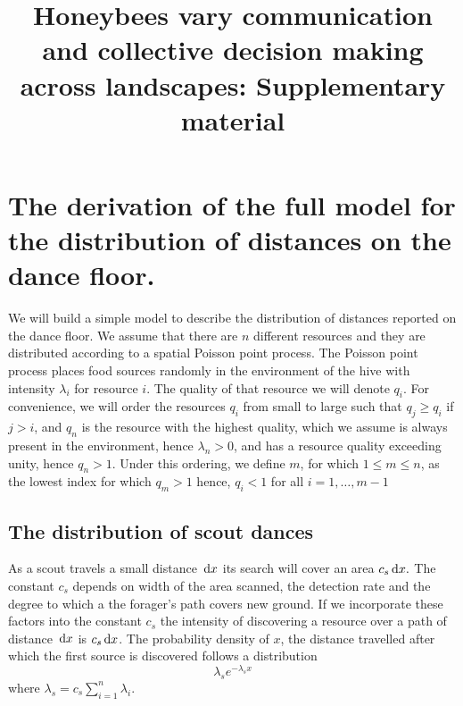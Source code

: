 \documentclass[12pt,letter]{amsart}
\newcommand{\df}[0]{{\,\rm d }}
\begin{document}


\vspace*{-7mm}

\title{Honeybees vary communication and collective decision making across landscapes: Supplementary material}
\maketitle



\section*{The derivation of the full model for the distribution of distances on the dance floor. }

We will build a simple model to describe the distribution of distances reported on the dance floor. We assume that there are $n$ different resources and they are distributed according to a spatial Poisson point process. The Poisson point process places food sources randomly in the environment of the hive with intensity $\lambda_i$ for resource $i$. The quality of that resource we will denote $q_i.$ For convenience, we will order the resources $q_i$ from small to large such that $q_j \ge q_i$ if $j>i$, and $q_n$ is the resource with the highest quality, which we assume is always present in the environment, hence $\lambda_n>0$, and has a resource quality exceeding unity, hence $q_n>1$. Under this ordering, we define $m$, for which $1\le m\le n$, as the lowest index for which $q_m>1$ hence, $q_i<1$ for all $i=1, \dots, m-1$

\subsection*{The distribution of scout dances}

As a scout travels a small distance $\df x$ its search will cover an area $c_s \df x.$ The constant $c_s$ depends on width of the area scanned, the detection rate and the degree to which a the forager's path covers new ground. If we incorporate these factors into the constant $c_s$ the intensity of discovering a resource over a path of distance $\df x$ is  $c_s \df x$. The probability density of $x$, the distance travelled after which the first source is discovered follows a distribution
$$\lambda_s e^{-\lambda_s x}$$
where $\lambda_s= c_s\sum_{i =1}^n\lambda_i.$
\end{document}
